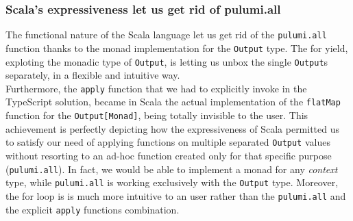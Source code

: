 \subsubsection{Scala's expressiveness let us get rid of pulumi.all}
The functional nature of the Scala language let us get rid of the \texttt{pulumi.all} function thanks to the monad implementation for the \texttt{Output} type.
The for yield, exploting the monadic type of \texttt{Output}, is letting us unbox the single \texttt{Output}s separately, in a flexible and intuitive way.\\
Furthermore, the \texttt{apply} function that we had to explicitly invoke in the TypeScript solution, became in Scala the actual implementation of the \texttt{flatMap} function for the \texttt{Output[Monad]}, being totally invisible to the user.
This achievement is perfectly depicting how the expressiveness of Scala permitted us to satisfy our need of applying functions on multiple separated \texttt{Output} values without resorting to an ad-hoc function created only for that specific purpose (\texttt{pulumi.all}).
In fact, we would be able to implement a monad for any \textit{context} type, while \texttt{pulumi.all} is working exclusively with the \texttt{Output} type.
Moreover, the for loop is is much more intuitive to an user rather than the \texttt{pulumi.all} and the explicit \texttt{apply} functions combination.






